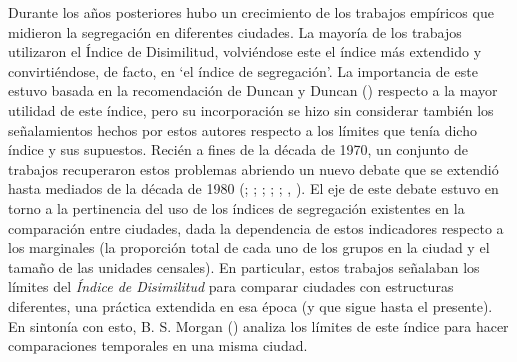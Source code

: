 \documentclass[
  spanish,
  a4paper,%
  chapterprefix=true,%
  DIV=calc,%
  twoside]{scrbook}%
\begin{document}
Durante los años posteriores hubo un crecimiento de los trabajos
empíricos que midieron la segregación en diferentes ciudades. La mayoría
de los trabajos utilizaron el Índice de Disimilitud, volviéndose este el
índice más extendido y convirtiéndose, de facto, en `el índice de
segregación'. La importancia de este estuvo basada en la recomendación
de Duncan y Duncan () respecto a la mayor utilidad de este índice, pero su
incorporación se hizo sin considerar también los señalamientos hechos
por estos autores respecto a los límites que tenía dicho índice y sus
supuestos. Recién a fines de la década de 1970, un conjunto de trabajos
recuperaron estos problemas abriendo un nuevo debate que se extendió
hasta mediados de la década de 1980 (; ; ; ; ; , ). El
eje de este debate estuvo en torno a la pertinencia del uso de los
índices de segregación existentes en la comparación entre ciudades, dada
la dependencia de estos indicadores respecto a los marginales (la
proporción total de cada uno de los grupos en la ciudad y el tamaño de
las unidades censales). En particular, estos trabajos señalaban los
límites del \emph{Índice de Disimilitud} para comparar ciudades con
estructuras diferentes, una práctica extendida en esa época (y que sigue
hasta el presente). En sintonía con esto, B. S. Morgan () analiza los
límites de este índice para hacer comparaciones temporales en una misma
ciudad.
\end{document}
